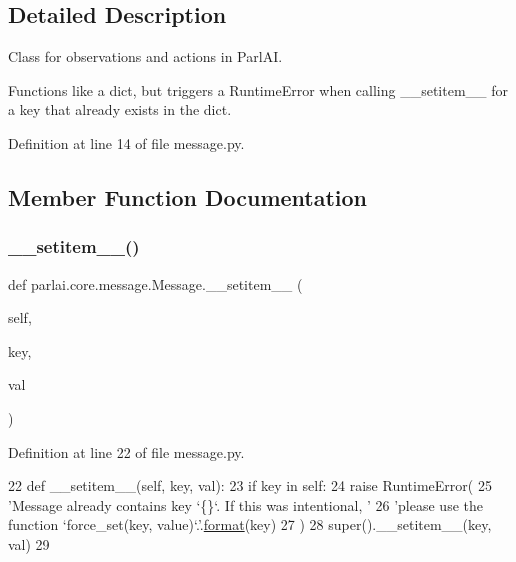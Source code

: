 \subsection{Detailed Description}
\begin{DoxyVerb}Class for observations and actions in ParlAI.

Functions like a dict, but triggers a RuntimeError when calling __setitem__ for a
key that already exists in the dict.
\end{DoxyVerb}
 

Definition at line 14 of file message.\+py.



\subsection{Member Function Documentation}
\mbox{\label{classparlai_1_1core_1_1message_1_1Message_a2fd83603b06a7da7ab7fc99649d855f6}} 
\subsubsection{\texorpdfstring{\+\_\+\+\_\+setitem\+\_\+\+\_\+()}{\_\_setitem\_\_()}}
{\footnotesize\ttfamily def parlai.\+core.\+message.\+Message.\+\_\+\+\_\+setitem\+\_\+\+\_\+ (\begin{DoxyParamCaption}\item[{}]{self,  }\item[{}]{key,  }\item[{}]{val }\end{DoxyParamCaption})}



Definition at line 22 of file message.\+py.


\begin{DoxyCode}
22     \textcolor{keyword}{def }\_\_setitem\_\_(self, key, val):
23         \textcolor{keywordflow}{if} key \textcolor{keywordflow}{in} self:
24             \textcolor{keywordflow}{raise} RuntimeError(
25                 \textcolor{stringliteral}{'Message already contains key `\{\}`. If this was intentional, '}
26                 \textcolor{stringliteral}{'please use the function `force\_set(key, value)`.'}.\hyperlink{namespaceparlai_1_1chat__service_1_1services_1_1messenger_1_1shared__utils_a32e2e2022b824fbaf80c747160b52a76}{format}(key)
27             )
28         super().\_\_setitem\_\_(key, val)
29 
\end{DoxyCode}
\mbox{\label{classparlai_1_1core_1_1message_1_1Message_a374ac4a5d73e853960cc0f964b73a7fd}} 
